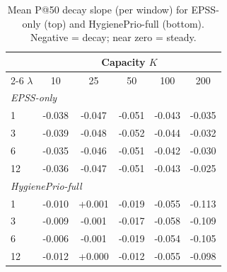 \begin{table}[!t]
 \caption{Mean P@50 decay slope (per window) for EPSS-only (top) and HygienePrio-full (bottom). Negative = decay; near zero = steady.}
 \label{tab:slopes}
 \centering
 \small
 \setlength{\tabcolsep}{4pt}
 \begin{tabular}{lccccc}
 \toprule
 & \multicolumn{5}{c}{Capacity $K$} \\
 \cmidrule(lr){2-6}
 $\lambda$ & 10 & 25 & 50 & 100 & 200 \\
 \midrule
 \multicolumn{6}{l}{\textit{EPSS-only}} \\
 1 & -0.038 & -0.047 & -0.051 & -0.043 & -0.035 \\
 3 & -0.039 & -0.048 & -0.052 & -0.044 & -0.032 \\
 6 & -0.035 & -0.046 & -0.051 & -0.042 & -0.030 \\
 12 & -0.036 & -0.047 & -0.051 & -0.043 & -0.025 \\
 \midrule
 \multicolumn{6}{l}{\textit{HygienePrio-full}} \\
 1 & -0.010 & +0.001 & -0.019 & -0.055 & -0.113 \\
 3 & -0.009 & -0.001 & -0.017 & -0.058 & -0.109 \\
 6 & -0.006 & -0.001 & -0.019 & -0.054 & -0.105 \\
 12 & -0.012 & +0.000 & -0.012 & -0.055 & -0.098 \\
 \bottomrule
 \end{tabular}
\end{table}
